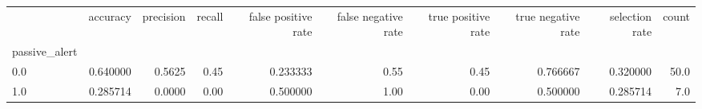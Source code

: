 \begin{tabular}{lrrrrrrrrr}
\toprule
{} &  accuracy &  precision &  recall &  false positive rate &  false negative rate &  true positive rate &  true negative rate &  selection rate &  count \\
passive\_alert &           &            &         &                      &                      &                     &                     &                 &        \\
\midrule
0.0           &  0.640000 &     0.5625 &    0.45 &             0.233333 &                 0.55 &                0.45 &            0.766667 &        0.320000 &   50.0 \\
1.0           &  0.285714 &     0.0000 &    0.00 &             0.500000 &                 1.00 &                0.00 &            0.500000 &        0.285714 &    7.0 \\
\bottomrule
\end{tabular}
